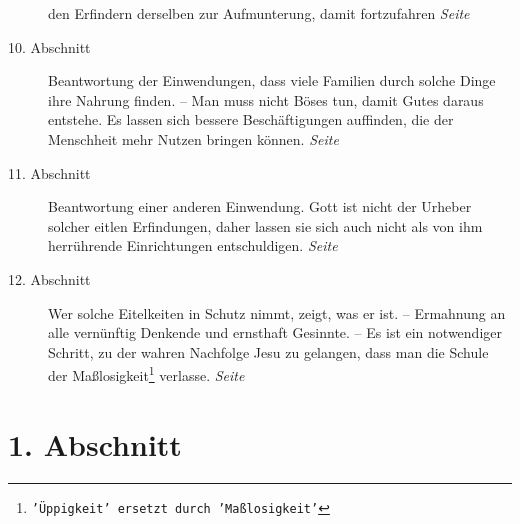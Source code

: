 \begin{description}
den Erfindern derselben zur Aufmunterung, damit fortzufahren
\dotfill \textit{Seite~\pageref{kap17_ab9}}\\
\item[10. Abschnitt] Beantwortung der Einwendungen, dass viele Familien durch
solche Dinge ihre Nahrung finden. -- Man muss nicht Böses tun, damit Gutes
daraus entstehe. Es lassen sich bessere Beschäftigungen auffinden, die der
Menschheit mehr Nutzen bringen können.
\dotfill \textit{Seite~\pageref{kap17_ab10}}\\
\item[11. Abschnitt] Beantwortung einer anderen Einwendung. Gott ist nicht der
Urheber solcher eitlen Erfindungen, daher lassen sie sich auch nicht als von
ihm herrührende Einrichtungen entschuldigen.
\dotfill \textit{Seite~\pageref{kap17_ab11}}\\
\item[12. Abschnitt] Wer solche Eitelkeiten in Schutz nimmt, zeigt, was er ist.
-- Ermahnung an alle vernünftig Denkende und ernsthaft Gesinnte. -- Es ist ein
notwendiger Schritt, zu der wahren Nachfolge Jesu zu gelangen, dass man die
Schule der Maßlosigkeit\footnote{\texttt{'Üppigkeit' ersetzt durch
'Maßlosigkeit'}}
verlasse.
\dotfill \textit{Seite~\pageref{kap17_ab12}}\\

\end{description}

\newpage

\section{1. Abschnitt} \label{kap17_ab1}

